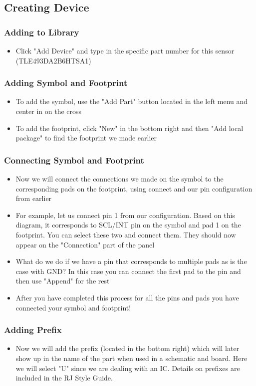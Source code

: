 \documentclass{article}
\begin{document}
\subsection{Creating Device}
\subsubsection{Adding to Library}
\begin{itemize}
    \item Click "Add Device" and type in the specific part number for this sensor (TLE493DA2B6HTSA1)
\end{itemize}
\subsubsection{Adding Symbol and Footprint}
\begin{itemize}
    \item To add the symbol, use the "Add Part" button located in the left menu and center in on the cross
    \item To add the footprint, click "New" in the bottom right and then "Add local package" to find the footprint we made earlier
\end{itemize}
\subsubsection{Connecting Symbol and Footprint}
\begin{itemize}
    \item Now we will connect the connections we made on the symbol to the corresponding pads on the footprint, using connect and our pin configuration from earlier 
    \item For example, let us connect pin 1 from our configuration. Based on this diagram, it corresponds to SCL/INT pin on the symbol and pad 1 on the footprint. You can select these two and connect them. They should now appear on the "Connection" part of the panel
    \item What do we do if we have a pin that corresponds to multiple pads as is the case with GND? In this case you can connect the first pad to the pin and then use "Append" for the rest
    \item After you have completed this process for all the pins and pads you have connected your symbol and footprint!
\end{itemize}
\subsubsection{Adding Prefix}
\begin{itemize}
    \item Now we will add the prefix (located in the bottom right) which will later show up in the name of the part when used in a schematic and board. Here we will select "U" since we are dealing with an IC. Details on prefixes are included in the RJ Style Guide.
\end{itemize}
\end{document}
